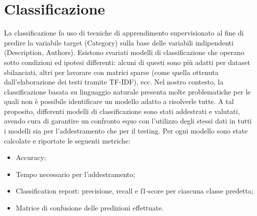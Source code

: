 \documentclass[12pt,oneside]{article}
\begin{document}
\section{Classificazione}
    \begin{justify}
        La classificazione fa uso di tecniche di apprendimento supervisionato al fine di predire la variabile target (Category) sulla base delle variabili indipendenti (Description, Authors).
        Esistono svariati modelli di classificazione che operano sotto condizioni ed ipotesi differenti: alcuni di questi sono più adatti per dataset sbilanciati, altri per lavorare con matrici sparse (come quella ottenuta dall’elaborazione dei testi tramite TF-IDF), ecc. Nel nostro contesto, la classificazione basata su linguaggio naturale presenta molte problematiche per le quali non è possibile identificare un modello adatto a risolverle tutte. A tal proposito, differenti modelli di classificazione sono stati addestrati e valutati, avendo cura di garantire un confronto equo con l'utilizzo degli stessi dati in tutti i modelli sia per l’addestramento che per il testing.
        Per ogni modello sono state calcolate e riportate le seguenti metriche:
        \begin{itemize}
            \item Accuracy;
            \item Tempo necessario per l’addestramento;
            \item Classification report: precisione, recall e f1-score per ciascuna classe predetta;
            \item Matrice di confusione delle predizioni effettuate.
        \end{itemize}
    \end{justify}
\end{document}
